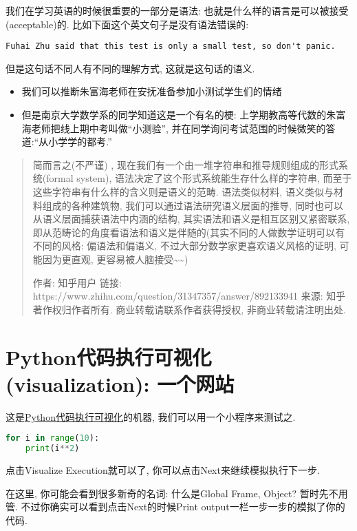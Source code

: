 我们在学习英语的时候很重要的一部分是语法: 也就是什么样的语言是可以被接受(acceptable)的. 比如下面这个英文句子是没有语法错误的: 
\begin{verbatim}
Fuhai Zhu said that this test is only a small test, so don't panic.
\end{verbatim}
但是这句话不同人有不同的理解方式, 这就是这句话的语义. 
\begin{itemize}
\item 我们可以推断朱富海老师在安抚准备参加小测试学生们的情绪
\item 但是南京大学数学系的同学知道这是一个有名的梗: 上学期教高等代数的朱富海老师把线上期中考叫做``小测验'', 并在同学询问考试范围的时候微笑的答道:``从小学学的都考.''
\end{itemize}
\begin{quote}
简而言之(不严谨) , 现在我们有一个由一堆字符串和推导规则组成的形式系统(formal system), 语法决定了这个形式系统能生存什么样的字符串, 而至于这些字符串有什么样的含义则是语义的范畴.
语法类似材料, 语义类似与材料组成的各种建筑物, 我们可以通过语法研究语义层面的推导, 同时也可以从语义层面捕获语法中内涵的结构,
其实语法和语义是相互区别又紧密联系, 即从范畴论的角度看语法和语义是伴随的(其实不同的人做数学证明可以有不同的风格: 偏语法和偏语义,
不过大部分数学家更喜欢语义风格的证明, 可能因为更直观, 更容易被人脑接受\textasciitilde\textasciitilde ) 

作者: 知乎用户 链接: https://www.zhihu.com/question/31347357/answer/892133941
来源: 知乎 著作权归作者所有. 商业转载请联系作者获得授权, 非商业转载请注明出处. 
\end{quote}

\section{Python代码执行可视化(visualization): 一个网站}

\begin{tool}
这是\href{https://pythontutor.com/visualize.html\#mode=display}{Python代码执行可视化}的机器,
我们可以用一个小程序来测试之.
\begin{lstlisting}[language=python]
for i in range(10):
    print(i**2)
\end{lstlisting}

点击Visualize Execution就可以了, 你可以点击Next来继续模拟执行下一步.

在这里, 你可能会看到很多新奇的名词: 什么是Global Frame, Object? 暂时先不用管. 不过你确实可以看到点击Next的时候Print output一栏一步一步的模拟了你的代码. 
\end{tool}

